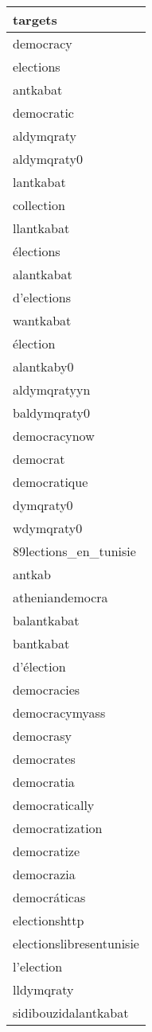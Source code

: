 
\begin{tabular}{l}
\toprule
targets\\
\midrule
democracy\\
elections\\
antkabat\\
democratic\\
aldymqraty\\
\addlinespace
aldymqraty0\\
lantkabat\\
collection\\
llantkabat\\
élections\\
\addlinespace
alantkabat\\
d'elections\\
wantkabat\\
élection\\
alantkaby0\\
\addlinespace
aldymqratyyn\\
baldymqraty0\\
democracynow\\
democrat\\
democratique\\
\addlinespace
dymqraty0\\
wdymqraty0\\
89lections\_en\_tunisie\\
antkab\\
atheniandemocra\\
\addlinespace
balantkabat\\
bantkabat\\
d'élection\\
democracies\\
democracymyass\\
\addlinespace
democrasy\\
democrates\\
democratia\\
democratically\\
democratization\\
\addlinespace
democratize\\
democrazia\\
democráticas\\
electionshttp\\
electionslibresentunisie\\
\addlinespace
l'election\\
lldymqraty\\
sidibouzidalantkabat\\
\bottomrule
\end{tabular}
